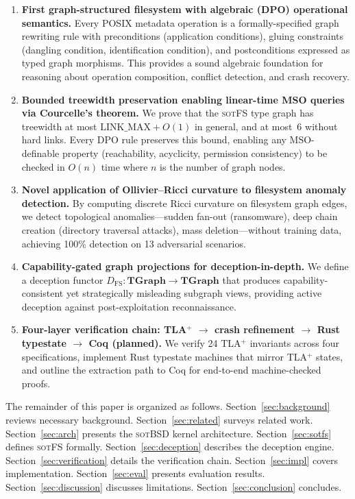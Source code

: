 \documentclass[11pt,a4paper]{article}
\theoremstyle{definition}
\theoremstyle{remark}
\newcommand{\sotfs}{\textsc{sotFS}}
\newcommand{\sotbsd}{\textsc{sotBSD}}
\newcommand{\cat}[1]{\ensuremath{\mathbf{#1}}}
\begin{document}
\begin{enumerate}[label=\textbf{C\arabic*}.,leftmargin=2em]
\item \textbf{First graph-structured filesystem with algebraic (DPO)
  operational semantics.} Every POSIX metadata operation is a
  formally-specified graph rewriting rule with preconditions
  (application conditions), gluing constraints (dangling condition,
  identification condition), and postconditions expressed as typed
  graph morphisms. This provides a sound algebraic foundation for
  reasoning about operation composition, conflict detection, and
  crash recovery.

\item \textbf{Bounded treewidth preservation enabling linear-time MSO
  queries via Courcelle's theorem.} We prove that the \sotfs{} type
  graph has treewidth at most $\mathrm{LINK\_MAX} + O(1)$ in general,
  and at most~6 without hard links. Every DPO rule preserves this
  bound, enabling any MSO-definable property (reachability, acyclicity,
  permission consistency) to be checked in $O(n)$ time where $n$ is the
  number of graph nodes.

\item \textbf{Novel application of Ollivier--Ricci curvature to
  filesystem anomaly detection.} By computing discrete Ricci curvature
  on filesystem graph edges, we detect topological anomalies---sudden
  fan-out (ransomware), deep chain creation (directory traversal
  attacks), mass deletion---without training data, achieving 100\%
  detection on 13 adversarial scenarios.

\item \textbf{Capability-gated graph projections for
  deception-in-depth.} We define a deception functor
  $D_{\mathrm{FS}} : \cat{TGraph} \to \cat{TGraph}$ that produces
  capability-consistent yet strategically misleading subgraph views,
  providing active deception against post-exploitation reconnaissance.

\item \textbf{Four-layer verification chain:
  TLA$^+$ $\to$ crash refinement $\to$ Rust typestate $\to$ Coq
  (planned).} We verify 24 TLA$^+$ invariants across four
  specifications, implement Rust typestate machines that mirror TLA$^+$
  states, and outline the extraction path to Coq for end-to-end
  machine-checked proofs.
\end{enumerate}

The remainder of this paper is organized as follows.
Section~\ref{sec:background} reviews necessary background.
Section~\ref{sec:related} surveys related work.
Section~\ref{sec:arch} presents the \sotbsd{} kernel architecture.
Section~\ref{sec:sotfs} defines \sotfs{} formally.
Section~\ref{sec:deception} describes the deception engine.
Section~\ref{sec:verification} details the verification chain.
Section~\ref{sec:impl} covers implementation.
Section~\ref{sec:eval} presents evaluation results.
Section~\ref{sec:discussion} discusses limitations.
Section~\ref{sec:conclusion} concludes.
\end{document}
